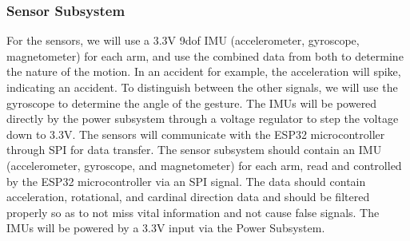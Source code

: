 \documentclass[12pt]{article}
\begin{document}
    \subsubsection{Sensor Subsystem} 
    For the sensors, we will use a 3.3V 9dof IMU (accelerometer, 
    gyroscope, magnetometer) \cite{STMicroelectronics2015LSM9DS1} for each arm, and use the combined 
    data from both to determine the nature of the motion. In an 
    accident for example, the acceleration will spike, indicating 
    an accident. To distinguish between the other signals, we will
    use the gyroscope to determine the angle of the gesture. The 
    IMUs will be powered directly by the power subsystem through 
    a voltage regulator to step the voltage down to 3.3V. The 
    sensors will communicate with the ESP32 microcontroller 
    through SPI for data transfer. 
    The sensor subsystem should contain an IMU (accelerometer, gyroscope, and magnetometer) for each arm, read and controlled by the ESP32 microcontroller via an SPI signal. The data should contain acceleration, rotational, and cardinal direction data and should be filtered properly so as to not miss vital information and not cause false signals. The IMUs will be powered by a 3.3V input via the Power Subsystem.
\end{document}
